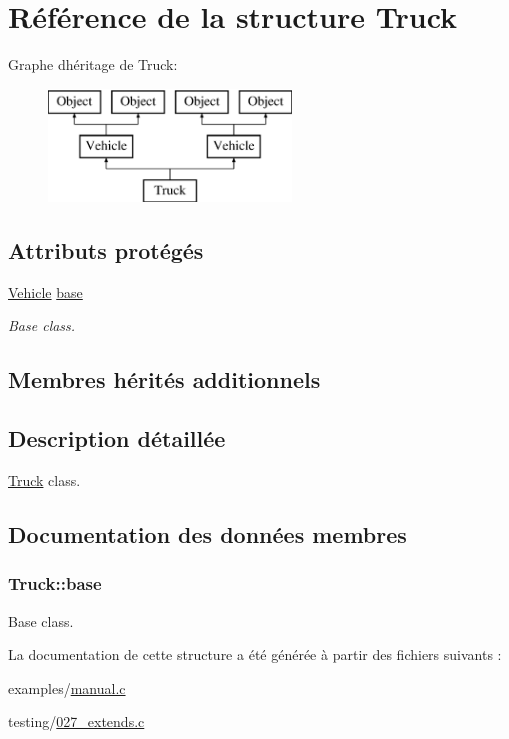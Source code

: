 \hypertarget{struct_truck}{}\section{Référence de la structure Truck}
\label{struct_truck}
Graphe d\textquotesingle{}héritage de Truck\+:\begin{figure}[H]
\begin{center}
\leavevmode
\includegraphics[height=3.000000cm]{struct_truck}
\end{center}
\end{figure}
\subsection*{Attributs protégés}
\begin{DoxyCompactItemize}
\item 
\hyperlink{struct_vehicle}{Vehicle} \hyperlink{struct_truck_ad0ac321609dda1a6c552488b05ec7ac8}{base}
\begin{DoxyCompactList}\small\item\em Base class. \end{DoxyCompactList}\end{DoxyCompactItemize}
\subsection*{Membres hérités additionnels}


\subsection{Description détaillée}
\hyperlink{struct_truck}{Truck} class. 

\subsection{Documentation des données membres}
\hypertarget{struct_truck_ad0ac321609dda1a6c552488b05ec7ac8}{}
\subsubsection[{base}]{ Truck\+::base\hspace{0.3cm}{\ttfamily [protected]}}\label{struct_truck_ad0ac321609dda1a6c552488b05ec7ac8}


Base class. 



La documentation de cette structure a été générée à partir des fichiers suivants \+:\begin{DoxyCompactItemize}
\item 
examples/\hyperlink{manual_8c}{manual.\+c}\item 
testing/\hyperlink{027__extends_8c}{027\+\_\+extends.\+c}\end{DoxyCompactItemize}
